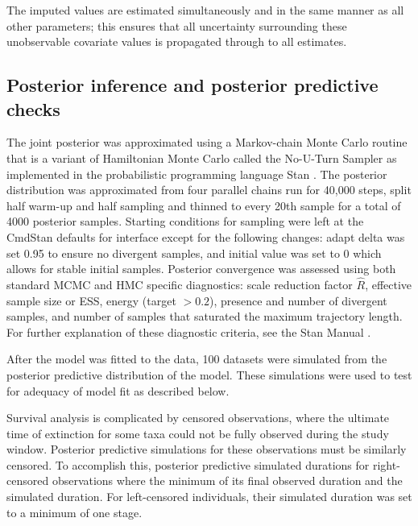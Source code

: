 \documentclass[11pt]{article}
\begin{document}
The imputed values are estimated simultaneously and in the same manner as all other parameters; this ensures that all uncertainty surrounding these unobservable covariate values is propagated through to all estimates.

\subsection*{Posterior inference and posterior predictive checks}

The joint posterior was approximated using a Markov-chain Monte Carlo routine that is a variant of Hamiltonian Monte Carlo called the No-U-Turn Sampler \citep{Hoffman2014} as implemented in the probabilistic programming language Stan \citep{2014stan}. The posterior distribution was approximated from four parallel chains run for 40,000 steps, split half warm-up and half sampling and thinned to every 20th sample for a total of 4000 posterior samples. Starting conditions for sampling were left at the CmdStan defaults for interface except for the following changes: adapt delta was set 0.95 to ensure no divergent samples, and initial value was set to 0 which allows for stable initial samples. Posterior convergence was assessed using both standard MCMC and HMC specific diagnostics: scale reduction factor \(\hat{R}\), effective sample size or ESS, energy (target \(>0.2\)), presence and number of divergent samples, and number of samples that saturated the maximum trajectory length. For further explanation of these diagnostic criteria, see the Stan Manual \citep{StanManual}.

After the model was fitted to the data, 100 datasets were simulated from the posterior predictive distribution of the model. These simulations were used to test for adequacy of model fit as described below.

Survival analysis is complicated by censored observations, where the ultimate time of extinction for some taxa could not be fully observed during the study window. Posterior predictive simulations for these observations must be similarly censored. To accomplish this, posterior predictive simulated durations for right-censored observations where the minimum of its final observed duration and the simulated duration. For left-censored individuals, their simulated duration was set to a minimum of one stage.
\end{document}
